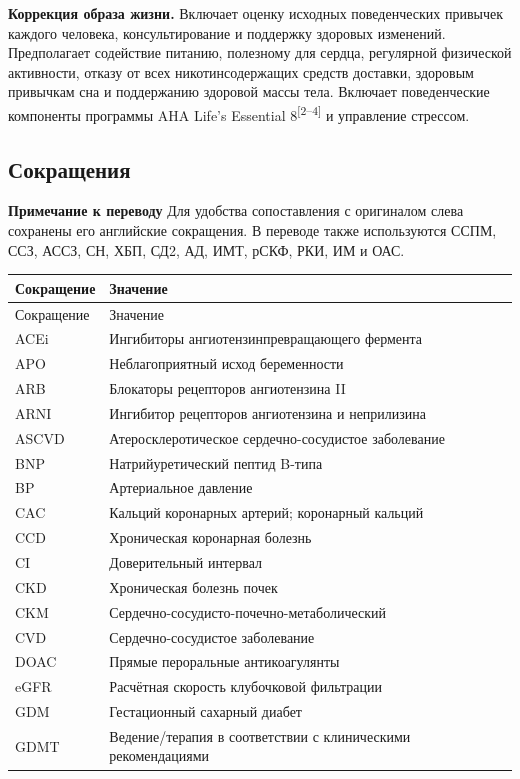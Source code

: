 \documentclass[11pt,a4paper]{article}
\newcommand{\src}[1]{\textsuperscript{[#1]}}
\newcommand{\editorial}[1]{\par\begingroup\small\color{black!70}\textbf{Примечание к переводу} #1\par\endgroup}
\begin{document}
\textbf{Коррекция образа жизни.} Включает оценку исходных поведенческих привычек каждого человека, консультирование и поддержку здоровых изменений. Предполагает содействие питанию, полезному для сердца, регулярной физической активности, отказу от всех никотинсодержащих средств доставки, здоровым привычкам сна и поддержанию здоровой массы тела. Включает поведенческие компоненты программы AHA Life's Essential 8\src{2--4} и управление стрессом.

\subsection{Сокращения}
\editorial{Для удобства сопоставления с оригиналом слева сохранены его английские сокращения. В переводе также используются ССПМ, ССЗ, АССЗ, СН, ХБП, СД2, АД, ИМТ, рСКФ, РКИ, ИМ и ОАС.}
{\small
\begin{longtable}{P{0.18\textwidth}P{0.75\textwidth}}
\toprule Сокращение & Значение\\\midrule
\endfirsthead
\toprule Сокращение & Значение\\\midrule
\endhead
ACEi & Ингибиторы ангиотензинпревращающего фермента\\
APO & Неблагоприятный исход беременности\\
ARB & Блокаторы рецепторов ангиотензина II\\
ARNI & Ингибитор рецепторов ангиотензина и неприлизина\\
ASCVD & Атеросклеротическое сердечно-сосудистое заболевание\\
BNP & Натрийуретический пептид B-типа\\
BP & Артериальное давление\\
CAC & Кальций коронарных артерий; коронарный кальций\\
CCD & Хроническая коронарная болезнь\\
CI & Доверительный интервал\\
CKD & Хроническая болезнь почек\\
CKM & Сердечно-сосудисто-почечно-метаболический\\
CVD & Сердечно-сосудистое заболевание\\
DOAC & Прямые пероральные антикоагулянты\\
eGFR & Расчётная скорость клубочковой фильтрации\\
GDM & Гестационный сахарный диабет\\
GDMT & Ведение/терапия в соответствии с клиническими рекомендациями\\

\end{longtable}}
\end{document}
